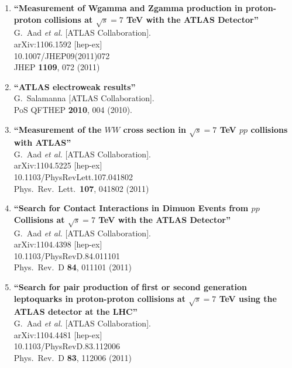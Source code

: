 \documentclass{article}
\begin{document}
\begin{enumerate}
\item%
{\bf ``Measurement of Wgamma and Zgamma production in proton-proton collisions at $\sqrt{s}=7$ TeV with the ATLAS Detector''}
  \\{}G.~Aad {\it et al.}  [ATLAS Collaboration].
  \\{}arXiv:1106.1592 [hep-ex]
    \\{}10.1007/JHEP09(2011)072
\\{}JHEP {\bf 1109}, 072 (2011) %


\item%
{\bf ``ATLAS electroweak results''}
  \\{}G.~Salamanna [ATLAS Collaboration].
  \\{}PoS QFTHEP {\bf 2010}, 004 (2010). %



\item%
{\bf ``Measurement of the $W W$ cross section in $\sqrt{s}=7$ TeV $pp$ collisions with ATLAS''}
  \\{}G.~Aad {\it et al.}  [ATLAS Collaboration].
  \\{}arXiv:1104.5225 [hep-ex]
    \\{}10.1103/PhysRevLett.107.041802
\\{}Phys.\ Rev.\ Lett.\  {\bf 107}, 041802 (2011) %


\item%
{\bf ``Search for Contact Interactions in Dimuon Events from $pp$ Collisions at $\sqrt{s}=7$ TeV with the ATLAS Detector''}
  \\{}G.~Aad {\it et al.}  [ATLAS Collaboration].
  \\{}arXiv:1104.4398 [hep-ex]
    \\{}10.1103/PhysRevD.84.011101
\\{}Phys.\ Rev.\ D {\bf 84}, 011101 (2011) %


\item%
{\bf ``Search for pair production of first or second generation leptoquarks in proton-proton collisions at $\sqrt{s}=7$ TeV using the ATLAS detector at the LHC''}
  \\{}G.~Aad {\it et al.}  [ATLAS Collaboration].
  \\{}arXiv:1104.4481 [hep-ex]
    \\{}10.1103/PhysRevD.83.112006
\\{}Phys.\ Rev.\ D {\bf 83}, 112006 (2011) %



\end{enumerate}
\end{document}

